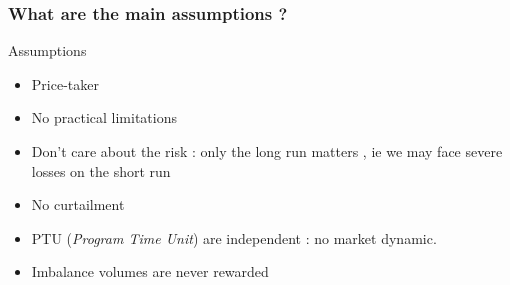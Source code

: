 \begin{frame}\frametitle{What are the main assumptions ?}
\begin{block}{Assumptions}
\begin{itemize}
  \item Price-taker %
  \item No practical limitations
  \item Don't care about the risk : only the long run matters , ie we may face
  severe losses on the short run
  \item No curtailment %
  \item PTU (\textit{Program Time Unit}) are independent : no market dynamic.
  \item Imbalance volumes are never rewarded
\end{itemize}
\end{block}
\end{frame}

